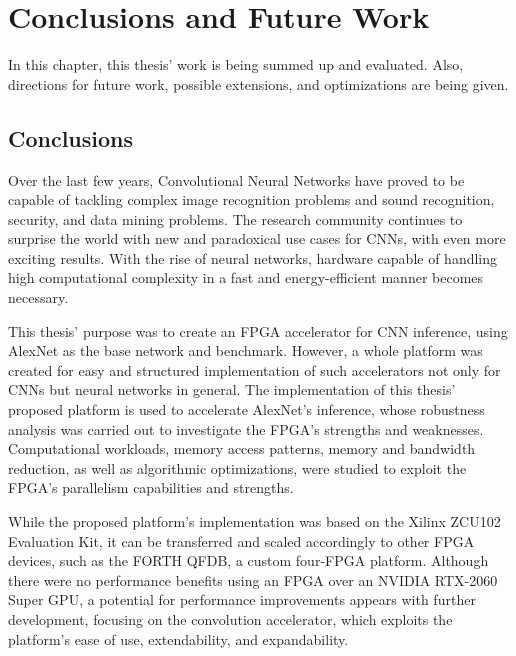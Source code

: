 \chapter{Conclusions and Future Work}
\label{Chapter-Conclusions-and-Future-Work}
In this chapter, this thesis' work is being summed up and evaluated. Also, directions for future work, possible extensions, and optimizations are being given.

\section{Conclusions}
Over the last few years, Convolutional Neural Networks have proved to be capable of tackling complex image recognition problems and sound recognition, security, and data mining problems. The research community continues to surprise the world with new and paradoxical use cases for CNNs, with even more exciting results. With the rise of neural networks, hardware capable of handling high computational complexity in a fast and energy-efficient manner becomes necessary.

This thesis' purpose was to create an FPGA accelerator for CNN inference, using AlexNet as the base network and benchmark. However, a whole platform was created for easy and structured implementation of such accelerators not only for CNNs but neural networks in general. The implementation of this thesis' proposed platform is used to accelerate AlexNet's inference, whose robustness analysis was carried out to investigate the FPGA's strengths and weaknesses. Computational workloads, memory access patterns, memory and bandwidth reduction, as well as algorithmic optimizations, were studied to exploit the FPGA's parallelism capabilities and strengths.

While the proposed platform's implementation was based on the Xilinx ZCU102 Evaluation Kit, it can be transferred and scaled accordingly to other FPGA devices, such as the FORTH QFDB, a custom four-FPGA platform. Although there were no performance benefits using an FPGA over an NVIDIA RTX-2060 Super GPU, a potential for performance improvements appears with further development, focusing on the convolution accelerator, which exploits the platform's ease of use, extendability, and expandability.

